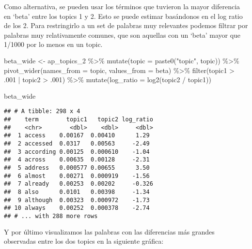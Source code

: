 \documentclass[
]{book}
\newenvironment{Shaded}{\begin{snugshade}}{\end{snugshade}}
\newcommand{\AttributeTok}[1]{\textcolor[rgb]{0.77,0.63,0.00}{#1}}
\newcommand{\DecValTok}[1]{\textcolor[rgb]{0.00,0.00,0.81}{#1}}
\newcommand{\FunctionTok}[1]{\textcolor[rgb]{0.00,0.00,0.00}{#1}}
\newcommand{\NormalTok}[1]{#1}
\newcommand{\OtherTok}[1]{\textcolor[rgb]{0.56,0.35,0.01}{#1}}
\newcommand{\SpecialCharTok}[1]{\textcolor[rgb]{0.00,0.00,0.00}{#1}}
\newcommand{\StringTok}[1]{\textcolor[rgb]{0.31,0.60,0.02}{#1}}
\begin{document}
Como alternativa, se pueden usar los términos que tuvieron la mayor diferencia en `beta' entre los topics 1 y 2. Esto se puede estimar basándonos en el log ratio de los 2. Para restringirlo a un set de palabras muy relevantes podemos filtrar por palabras muy relativamente comunes, que son aquellas con un `beta' mayor que 1/1000 por lo menos en un topic.

\begin{Shaded}
\begin{Highlighting}[]
\NormalTok{beta\_wide }\OtherTok{\textless{}{-}}\NormalTok{ ap\_topics\_2 }\SpecialCharTok{\%\textgreater{}\%}
  \FunctionTok{mutate}\NormalTok{(}\AttributeTok{topic =} \FunctionTok{paste0}\NormalTok{(}\StringTok{"topic"}\NormalTok{, topic)) }\SpecialCharTok{\%\textgreater{}\%}
  \FunctionTok{pivot\_wider}\NormalTok{(}\AttributeTok{names\_from =}\NormalTok{ topic, }\AttributeTok{values\_from =}\NormalTok{ beta) }\SpecialCharTok{\%\textgreater{}\%} 
  \FunctionTok{filter}\NormalTok{(topic1 }\SpecialCharTok{\textgreater{}}\NormalTok{ .}\DecValTok{001} \SpecialCharTok{|}\NormalTok{ topic2 }\SpecialCharTok{\textgreater{}}\NormalTok{ .}\DecValTok{001}\NormalTok{) }\SpecialCharTok{\%\textgreater{}\%}
  \FunctionTok{mutate}\NormalTok{(}\AttributeTok{log\_ratio =} \FunctionTok{log2}\NormalTok{(topic2 }\SpecialCharTok{/}\NormalTok{ topic1))}

\NormalTok{beta\_wide}
\end{Highlighting}
\end{Shaded}

\begin{verbatim}
## # A tibble: 298 x 4
##    term        topic1   topic2 log_ratio
##    <chr>        <dbl>    <dbl>     <dbl>
##  1 access    0.00167  0.00410      1.29 
##  2 accessed  0.0317   0.00563     -2.49 
##  3 according 0.00125  0.000610    -1.04 
##  4 across    0.00635  0.00128     -2.31 
##  5 address   0.000577 0.00655      3.50 
##  6 almost    0.00271  0.000919    -1.56 
##  7 already   0.00253  0.00202     -0.326
##  8 also      0.0101   0.00398     -1.34 
##  9 although  0.00323  0.000972    -1.73 
## 10 always    0.00252  0.000378    -2.74 
## # ... with 288 more rows
\end{verbatim}

Y por último visualizamos las palabras con las diferencias más grandes observadas entre los dos topics en la siguiente gráfica:
\end{document}
